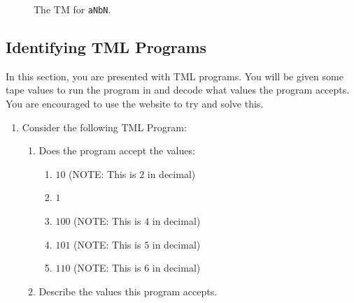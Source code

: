 \begin{appendices}
\begin{itemize}
\begin{figure}[htb]
        \caption{The TM for \texttt{aNbN}.}
        \label{fig:corresponding_TM_aNbN}
    \end{figure}
    
\end{itemize}

\subsection{Identifying TML Programs}
In this section, you are presented with TML programs. You will be given some tape values to run the program in and decode what values the program accepts. You are encouraged to use the website to try and solve this.

\begin{enumerate}
    \item Consider the following TML Program:
    

    \begin{enumerate}
        \item Does the program accept the values:
        \begin{enumerate}
            \item $10$ (NOTE: This is $2$ in decimal)
            \item $1$
            \item $100$ (NOTE: This is $4$ in decimal)
            \item $101$ (NOTE: This is $5$ in decimal)
            \item $110$ (NOTE: This is $6$ in decimal)
        \end{enumerate}
        \item Describe the values this program accepts.
    \end{enumerate}
    \newpage


\end{enumerate}
\end{appendices}
